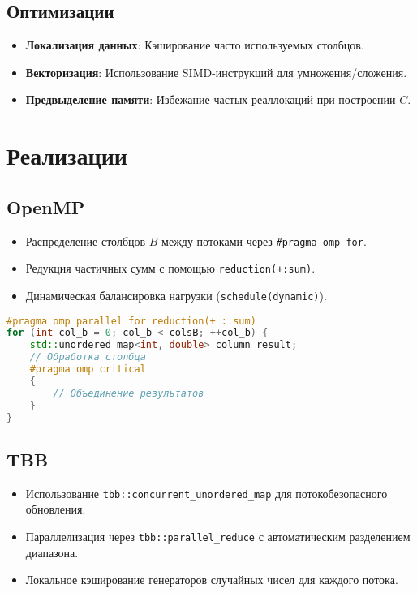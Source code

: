 \documentclass[a4paper,12pt]{article}
\begin{document}
\subsection{Оптимизации}
\begin{itemize}
\item \textbf{Локализация данных}: Кэширование часто используемых столбцов.
\item \textbf{Векторизация}: Использование SIMD-инструкций для умножения/сложения.
\item \textbf{Предвыделение памяти}: Избежание частых реаллокаций при построении \( C \).
\end{itemize}

\section{Реализации}
\subsection{OpenMP}
\begin{itemize}
\item Распределение столбцов \( B \) между потоками через \texttt{\#pragma omp for}.
\item Редукция частичных сумм с помощью \texttt{reduction(+:sum)}.
\item Динамическая балансировка нагрузки (\texttt{schedule(dynamic)}).
\end{itemize}

\begin{lstlisting}[language=C++]
#pragma omp parallel for reduction(+ : sum)
for (int col_b = 0; col_b < colsB; ++col_b) {
    std::unordered_map<int, double> column_result;
    // Обработка столбца
    #pragma omp critical
    {
        // Объединение результатов
    }
}
\end{lstlisting}

\subsection{TBB}
\begin{itemize}
\item Использование \texttt{tbb::concurrent\_unordered\_map} для потокобезопасного обновления.
\item Параллелизация через \texttt{tbb::parallel\_reduce} с автоматическим разделением диапазона.
\item Локальное кэширование генераторов случайных чисел для каждого потока.
\end{itemize}
\end{document}
